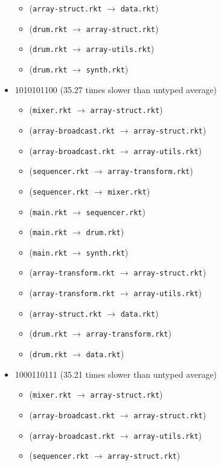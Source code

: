 \documentclass{article}
\newcommand{\mono}[1]{\texttt{#1}}
\begin{document}
\begin{itemize}
\begin{itemize}
  \item (\mono{array-struct.rkt} $\rightarrow$ \mono{data.rkt})
  \item (\mono{drum.rkt} $\rightarrow$ \mono{array-struct.rkt})
  \item (\mono{drum.rkt} $\rightarrow$ \mono{array-utils.rkt})
  \item (\mono{drum.rkt} $\rightarrow$ \mono{synth.rkt})
  \end{itemize}
\item 1010101100 (35.27 times slower than untyped average)
  \begin{itemize}
  \item (\mono{mixer.rkt} $\rightarrow$ \mono{array-struct.rkt})
  \item (\mono{array-broadcast.rkt} $\rightarrow$ \mono{array-struct.rkt})
  \item (\mono{array-broadcast.rkt} $\rightarrow$ \mono{array-utils.rkt})
  \item (\mono{sequencer.rkt} $\rightarrow$ \mono{array-transform.rkt})
  \item (\mono{sequencer.rkt} $\rightarrow$ \mono{mixer.rkt})
  \item (\mono{main.rkt} $\rightarrow$ \mono{sequencer.rkt})
  \item (\mono{main.rkt} $\rightarrow$ \mono{drum.rkt})
  \item (\mono{main.rkt} $\rightarrow$ \mono{synth.rkt})
  \item (\mono{array-transform.rkt} $\rightarrow$ \mono{array-struct.rkt})
  \item (\mono{array-transform.rkt} $\rightarrow$ \mono{array-utils.rkt})
  \item (\mono{array-struct.rkt} $\rightarrow$ \mono{data.rkt})
  \item (\mono{drum.rkt} $\rightarrow$ \mono{array-transform.rkt})
  \item (\mono{drum.rkt} $\rightarrow$ \mono{data.rkt})
  \end{itemize}
\item 1000110111 (35.21 times slower than untyped average)
  \begin{itemize}
  \item (\mono{mixer.rkt} $\rightarrow$ \mono{array-struct.rkt})
  \item (\mono{array-broadcast.rkt} $\rightarrow$ \mono{array-struct.rkt})
  \item (\mono{array-broadcast.rkt} $\rightarrow$ \mono{array-utils.rkt})
  \item (\mono{sequencer.rkt} $\rightarrow$ \mono{array-struct.rkt})

\end{itemize}
\end{itemize}
\end{document}
